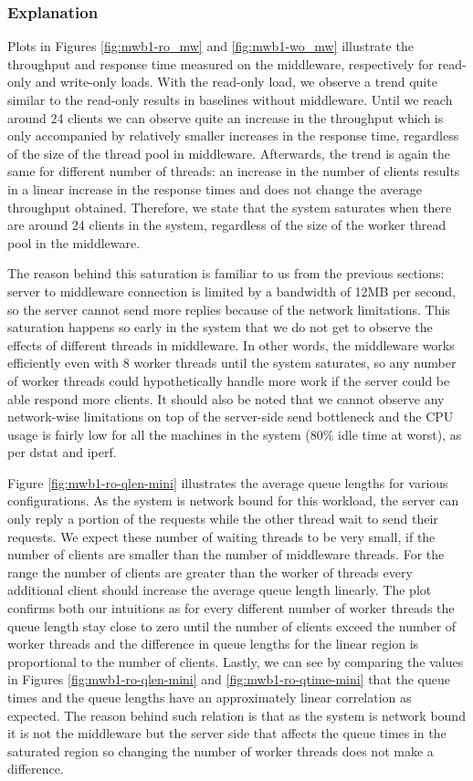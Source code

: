 \documentclass[11pt,a4paper]{article}
\begin{document}
\subsubsection{Explanation} \label{sec:mwb1-exp}
Plots in Figures \ref{fig:mwb1-ro_mw} and \ref{fig:mwb1-wo_mw} illustrate the throughput and response time measured on the middleware, respectively for read-only and write-only loads. With the read-only load, we observe a trend quite similar to the read-only results in baselines without middleware. Until we reach around 24 clients we can observe quite an increase in the throughput which is only accompanied by relatively smaller increases in the response time, regardless of the size of the thread pool in middleware. Afterwards, the trend is again the same for different number of threads: an increase in the number of clients results in a linear increase in the response times and does not change the average throughput obtained. Therefore, we state that the system saturates when there are around 24 clients in the system, regardless of the size of the worker thread pool in the middleware.
\par The reason behind this saturation is familiar to us from the previous sections: server to middleware connection is limited by a bandwidth of 12MB per second, so the server cannot send more replies because of the network limitations. This saturation happens so early in the system that we do not get to observe the effects of different threads in middleware. In other words, the middleware works efficiently even with 8 worker threads until the system saturates, so any number of worker threads could hypothetically handle more work if the server could be able respond more clients. It should also be noted that we cannot observe any network-wise limitations on top of the server-side send bottleneck and the CPU usage is fairly low for all the machines in the system ($80\%$ idle time at worst), as per dstat and iperf. 
\par {} Figure \ref{fig:mwb1-ro-qlen-mini} illustrates the average queue lengths for various configurations. As the system is network bound for this workload, the server can only reply a portion of the requests while the other thread wait to send their requests. We expect these number of waiting threads to be very small, if the number of clients are smaller than the number of middleware threads. For the range the number of clients are greater than the worker of threads every additional client should increase the average queue length linearly. The plot confirms both our intuitions as for every different number of worker threads the queue length stay close to zero until the number of clients exceed the number of worker threads and the difference in queue lengths for the linear region is proportional to the number of clients. Lastly, we can see by comparing the values in Figures \ref{fig:mwb1-ro-qlen-mini} and \ref{fig:mwb1-ro-qtime-mini} that the queue times and the queue lengths have an approximately linear correlation as expected. The reason behind such relation is that as the system is network bound it is not the middleware but the server side that affects the queue times in the saturated region so changing the number of worker threads does not make a difference.
\end{document}
